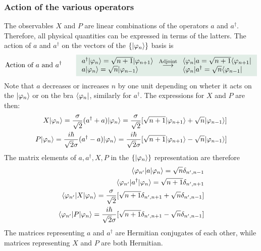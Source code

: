 \subsubsection{Action of the various operators}
The observables $X$ and $P$ are linear combinations of the operators $a$ and $a^\dagger$. Therefore, all physical quantities can be expressed in terms of the latters.
The action of $a$ and $a^\dagger$ on the vectors of the $\{|\varphi_n\rangle\}$ basis is 
\begin{align}
    \text{Action of $a$ and $a^\dagger$}\qquad
    \highlight{
    \begin{array}{l}
    a^\dagger\ket{\varphi_n}=\sqrt{n+1}\ket{\varphi_{n+1}}\\
    a\ket{\varphi_n}=\sqrt{n}\ket{\varphi_{n-1}}\end{array}\stackrel{\text{Adjoint}}{\longrightarrow}
    \begin{array}{l}
    \bra{\varphi_n}a=\sqrt{n+1}\bra{\varphi_{n+1}}\\
    \bra{\varphi_n}a^\dagger=\sqrt{n}\bra{\varphi_{n-1}} 
    \end{array}}
    \label{eq:actionofaa}
\end{align}
Note that $a$ decreases or increases $n$ by one unit depending on wheter it acts on the $|\varphi_n\rangle$ or on the bra $\langle\varphi_n|$, similarly for $a^\dagger$.
The expressions for $X$ and $P$ are then:
\begin{align}
    X|\varphi_n\rangle=\frac{\sigma}{\sqrt{2}}(a^\dagger+a)|\varphi_n\rangle=\frac{\sigma}{\sqrt{2}}[\sqrt{n+1}|\varphi_{n+1}\rangle+\sqrt{n}|\varphi_{n-1}\rangle]\\
    P|\varphi_n\rangle=\frac{i\hbar}{\sqrt{2}\sigma}(a^\dagger-a)|\varphi_n\rangle=\frac{i\hbar}{\sqrt{2}\sigma}[\sqrt{n+1}|\varphi_{n+1}\rangle-\sqrt{n}|\varphi_{n-1}\rangle]
    \label{eq:XPintermsofaa}
\end{align}
The matrix elements of $a,a^\dagger,X,P$ in the $\{|\varphi_n\rangle\}$ representation are therefore
\begin{align}
    \langle\varphi_{n'}|a|\varphi_n\rangle=\sqrt{n}\delta_{n',n-1}\\
    \langle\varphi_{n'}|a^\dagger|\varphi_n\rangle=\sqrt{n+1}\delta_{n',n+1}\\
    \langle\varphi_{n'}|X|\varphi_n\rangle=\frac{\sigma}{\sqrt{2}}[\sqrt{n+1}\delta_{n',n+1}+\sqrt{n}\delta_{n',n-1}]\\
    \langle\varphi_{n'}|P|\varphi_n\rangle=\frac{i\hbar}{\sqrt{2}\sigma}[\sqrt{n+1}\delta_{n',n+1}-\sqrt{n}\delta_{n',n-1}]
\end{align}
The matrices representing $a$ and $a^\dagger$ are Hermitian conjugates of each other, while matrices representing $X$ and $P$ are both Hermitian.
%
